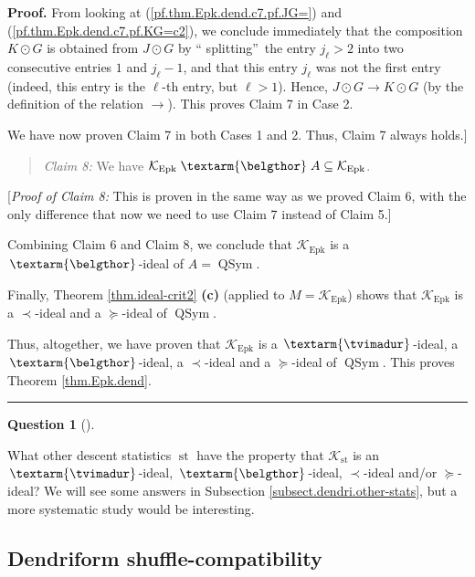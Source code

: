 \documentclass[numbers=enddot,12pt,final,onecolumn,notitlepage]{scrartcl}%
\theoremstyle{definition}
\newtheorem{quest}[theo]{Question}
\newenvironment{question}[1][]
{\begin{quest}[#1]\begin{leftbar}}
{\end{leftbar}\end{quest}}
\newenvironment{statement}{\begin{quote}}{\end{quote}}
\newenvironment{proof}[1][Proof]{\noindent\textbf{#1.} }{\ \rule{0.5em}{0.5em}}
\newenvironment{question}[1][Question]{\noindent\textbf{#1.} }{\ \rule{0.5em}{0.5em}}
\newenvironment{verlong}{}{}
\newcommand{\tvi}{\left. \textarm{\tvimadur} \right.}
\newcommand{\bel}{\left. \textarm{\belgthor} \right.}
\begin{document}
\begin{verlong}
\begin{proof}
From looking at (\ref{pf.thm.Epk.dend.c7.pf.JG=}) and
(\ref{pf.thm.Epk.dend.c7.pf.KG=c2}), we conclude immediately that the
composition $K\odot G$ is obtained from $J\odot G$ by \textquotedblleft
splitting\textquotedblright\ the entry $j_{\ell}>2$ into two consecutive
entries $1$ and $j_{\ell}-1$, and that this entry $j_{\ell}$ was not the first
entry (indeed, this entry is the $\ell$-th entry, but $\ell>1$). Hence,
$J\odot G\rightarrow K\odot G$ (by the definition of the relation
$\rightarrow$). This proves Claim 7 in Case 2.

We have now proven Claim 7 in both Cases 1 and 2. Thus, Claim 7 always holds.]

\begin{statement}
\textit{Claim 8:} We have $\mathcal{K}_{\operatorname*{Epk}}\bel
A\subseteq\mathcal{K}_{\operatorname*{Epk}}$.
\end{statement}

[\textit{Proof of Claim 8:} This is proven in the same way as we proved Claim
6, with the only difference that now we need to use Claim 7 instead of Claim 5.]

Combining Claim 6 and Claim 8, we conclude that $\mathcal{K}%
_{\operatorname*{Epk}}$ is a $\bel  $-ideal of $A=\operatorname*{QSym}$.

Finally, Theorem \ref{thm.ideal-crit2} \textbf{(c)} (applied to $M=\mathcal{K}%
_{\operatorname*{Epk}}$) shows that $\mathcal{K}_{\operatorname*{Epk}}$ is a
$\left.  \prec\right.  $-ideal and a $\left.  \succeq\right.  $-ideal of
$\operatorname*{QSym}$.

Thus, altogether, we have proven that $\mathcal{K}_{\operatorname*{Epk}}$ is a
$\tvi$-ideal, a $\bel$-ideal, a $\left.  \prec\right.  $-ideal and a $\left.
\succeq\right.  $-ideal of $\operatorname*{QSym}$. This proves Theorem
\ref{thm.Epk.dend}.
\end{proof}

\begin{question}
What other descent statistics $\operatorname*{st}$ have the property that
$\mathcal{K}_{\operatorname*{st}}$ is an $\tvi$-ideal, $\bel$-ideal, $\left.
\prec\right.  $-ideal and/or $\left.  \succeq\right.  $-ideal? We will see
some answers in Subsection \ref{subsect.dendri.other-stats}, but a more
systematic study would be interesting.
\end{question}

\subsection{Dendriform shuffle-compatibility}


\end{verlong}
\end{document}
